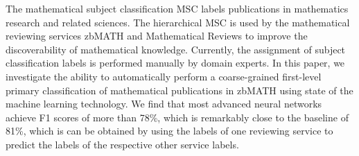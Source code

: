 The mathematical subject classification MSC labels publications in mathematics research and related sciences.
The hierarchical MSC is used by the mathematical reviewing services zbMATH and Mathematical Reviews to improve the discoverability of mathematical knowledge.
Currently, the assignment of subject classification labels is performed manually by domain experts.
In this paper, we investigate the ability to automatically perform a coarse-grained first-level primary classification of mathematical publications in zbMATH using state of the machine learning technology.
We find that most advanced neural networks achieve F1 scores of more than 78\%, which is remarkably close to the baseline of 81\%, which is can be obtained by using the labels of one reviewing service to predict the labels of the respective other service labels.